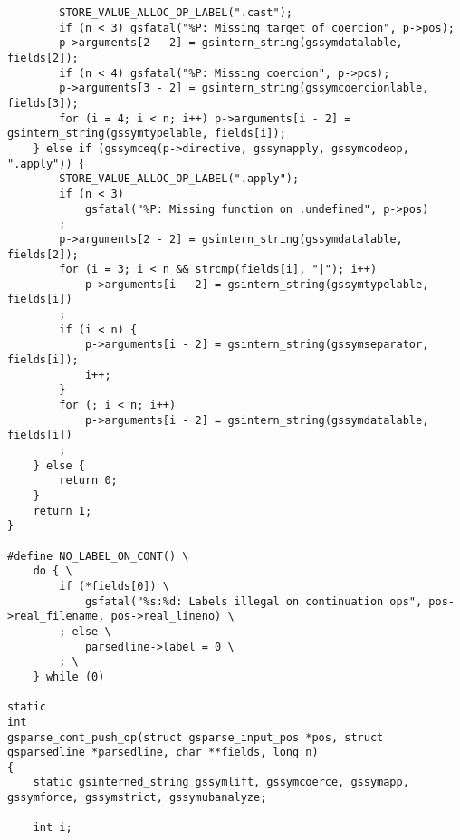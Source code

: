 \documentclass{report}
\begin{document}
\begin{verbatim}
        STORE_VALUE_ALLOC_OP_LABEL(".cast");
        if (n < 3) gsfatal("%P: Missing target of coercion", p->pos);
        p->arguments[2 - 2] = gsintern_string(gssymdatalable, fields[2]);
        if (n < 4) gsfatal("%P: Missing coercion", p->pos);
        p->arguments[3 - 2] = gsintern_string(gssymcoercionlable, fields[3]);
        for (i = 4; i < n; i++) p->arguments[i - 2] = gsintern_string(gssymtypelable, fields[i]);
    } else if (gssymceq(p->directive, gssymapply, gssymcodeop, ".apply")) {
        STORE_VALUE_ALLOC_OP_LABEL(".apply");
        if (n < 3)
            gsfatal("%P: Missing function on .undefined", p->pos)
        ;
        p->arguments[2 - 2] = gsintern_string(gssymdatalable, fields[2]);
        for (i = 3; i < n && strcmp(fields[i], "|"); i++)
            p->arguments[i - 2] = gsintern_string(gssymtypelable, fields[i])
        ;
        if (i < n) {
            p->arguments[i - 2] = gsintern_string(gssymseparator, fields[i]);
            i++;
        }
        for (; i < n; i++)
            p->arguments[i - 2] = gsintern_string(gssymdatalable, fields[i])
        ;
    } else {
        return 0;
    }
    return 1;
}

#define NO_LABEL_ON_CONT() \
    do { \
        if (*fields[0]) \
            gsfatal("%s:%d: Labels illegal on continuation ops", pos->real_filename, pos->real_lineno) \
        ; else \
            parsedline->label = 0 \
        ; \
    } while (0)

static
int
gsparse_cont_push_op(struct gsparse_input_pos *pos, struct gsparsedline *parsedline, char **fields, long n)
{
    static gsinterned_string gssymlift, gssymcoerce, gssymapp, gssymforce, gssymstrict, gssymubanalyze;

    int i;


\end{verbatim}
\end{document}

